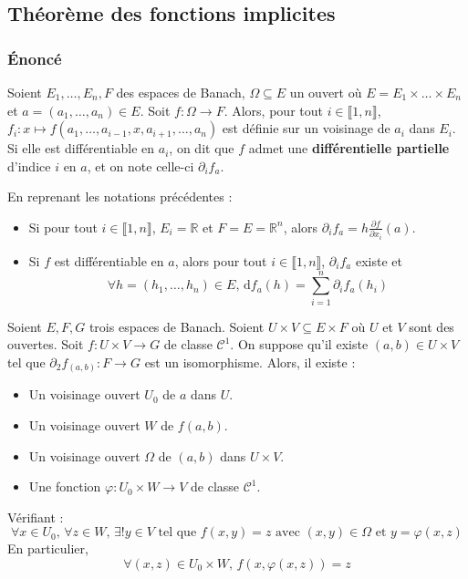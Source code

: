 	\subsection{Théorème des fonctions implicites}

	\subsubsection{Énoncé}


	\begin{definition}
		Soient $E_1, \dots, E_n, F$ des espaces de Banach, $\Omega \subseteq E$ un ouvert où $E = E_1 \times \dots \times E_n$ et $a = (a_1, \dots, a_n) \in E$. Soit $f : \Omega \rightarrow F$. Alors, pour tout $i \in \llbracket 1, n \rrbracket$, $f_i : x \mapsto f(a_1, \dots, a_{i-1}, x, a_{i+1}, \dots, a_n)$ est définie sur un voisinage de $a_i$ dans $E_i$. Si elle est différentiable en $a_i$, on dit que $f$ admet une \textbf{différentielle partielle} d'indice $i$ en $a$, et on note celle-ci $\partial_i f_a$.
	\end{definition}

	\begin{remark}
		En reprenant les notations précédentes :
		\begin{itemize}
			\item Si pour tout $i \in \llbracket 1, n \rrbracket$, $E_i = \mathbb{R}$ et $F = E = \mathbb{R}^n$, alors $\partial_i f_a = h \frac{\partial f}{\partial x_i} (a)$.
			\item Si $f$ est différentiable en $a$, alors pour tout $i \in \llbracket 1, n \rrbracket$, $\partial_i f_a$ existe et
			\[ \forall h = (h_1, \dots, h_n) \in E, \, \mathrm{d}f_a(h) = \sum_{i=1}^{n} \partial_i f_a(h_i) \]
		\end{itemize}
	\end{remark}

	\begin{theorem}
		Soient $E, F, G$ trois espaces de Banach. Soient $U \times V \subseteq E \times F$ où $U$ et $V$ sont des ouvertes. Soit $f : U \times V \rightarrow G$ de classe $\mathcal{C}^1$. On suppose qu'il existe $(a,b) \in U \times V$ tel que $\partial_2 f_{(a,b)} : F \rightarrow G$ est un isomorphisme. Alors, il existe :
		\begin{itemize}
			\item Un voisinage ouvert $U_0$ de $a$ dans $U$.
			\item Un voisinage ouvert $W$ de $f(a,b)$.
			\item Un voisinage ouvert $\Omega$ de $(a,b)$ dans $U \times V$.
			\item Une fonction $\varphi : U_0 \times W \rightarrow V$ de classe $\mathcal{C}^1$.
		\end{itemize}
		Vérifiant :
		\[ \forall x \in U_0, \, \forall z \in W, \, \exists! y \in V \text{ tel que } f(x,y)=z \text{ avec } (x, y) \in \Omega \text{ et } y=\varphi(x,z) \]
		En particulier,
		\[ \forall (x,z) \in U_0 \times W, \, f(x, \varphi(x,z)) = z \]
	\end{theorem}

